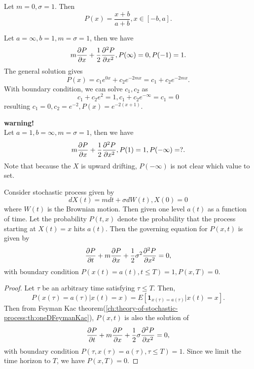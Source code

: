 \begin{refsection}
\begin{example}
	Let $m = 0,\sigma = 1$. Then
	$$P(x)=\frac{x+b}{a+b},x\in[-b,a].$$
\end{example}

\begin{example}
	Let $a = \infty,b=1,m=\sigma=1$, then we have
	$$m\frac{\partial P}{\partial x} + \frac{1}{2}\frac{\partial^2 P }{\partial x^2}, P(\infty)=0,P(-1) =1.$$
	The general solution gives 
	$$P(x) = c_1 e^{0x} + c_2 e^{-2mx} = c_1 + c_2e^{-2mx}.$$
	With boundary condition, we can solve $c_1,c_2$ as
	$$c_1 + c_2e^{2} = 1, c_1 + c_2e^{-\infty} = c_1 = 0 $$
	resulting $c_1 = 0, c_2 = e^{-2}, P(x) = e^{-2(x+1)}$.
\end{example}

\begin{example}
	\textbf{warning!}\\
	Let $a = 1,b=\infty,m=\sigma=1$, then we have
	$$m\frac{\partial P}{\partial x} + \frac{1}{2}\frac{\partial^2 P }{\partial x^2}, P(1)=1,P(-\infty) =?.$$
	Note that because the $X$ is upward drifting, $P(-\infty)$ is not clear which value to set.
\end{example}


\begin{lemma}\label{ch:theory-of-stochastic-process:th:FeymanKacmethodFirstPassageTimeDynamicBoundaryFinteTime}
	Consider stochastic process given by 
	$$dX(t) = mdt + \sigma dW(t),X(0) = 0$$
	where $W(t)$ is the Brownian motion. Then given one level $a(t)$ as a function of time. Let the probability $P(t,x)$ denote the probability that the process starting at $X(t)=x$ hits $a(t)$. Then the governing equation for $P(x,t)$ is given by
	$$\frac{\partial P}{\partial t} +m\frac{\partial P}{\partial x} + \frac{1}{2}\sigma^2 \frac{\partial^2 P}{\partial x^2} = 0,$$
	with boundary condition $P(x(t)=a(t),t\leq T) = 1, P(x,T) = 0$.
\end{lemma}
\begin{proof}
	Let $\tau$ be an arbitrary time satisfying $\tau \leq T$. Then,
	$$P(x(\tau) = a(\tau)| x(t) = x) = E[\bm{1}_{x(\tau) = a(\tau)}|x(t) = x].$$
	Then from Feyman Kac theorem(\autoref{ch:theory-of-stochastic-process:th:oneDFeymanKac}), $P(x,t)$ is also the solution of
	$$\frac{\partial P}{\partial t} + m\frac{\partial P}{\partial x} + \frac{1}{2}\sigma  \frac{\partial^2 P}{\partial x^2} = 0,$$
	with boundary condition $P(\tau ,x(\tau) = a(\tau),\tau \leq T) = 1$. 
	Since we limit the time horizon to $T$, we have $P(x,T) = 0$. 
\end{proof}




\end{refsection}
